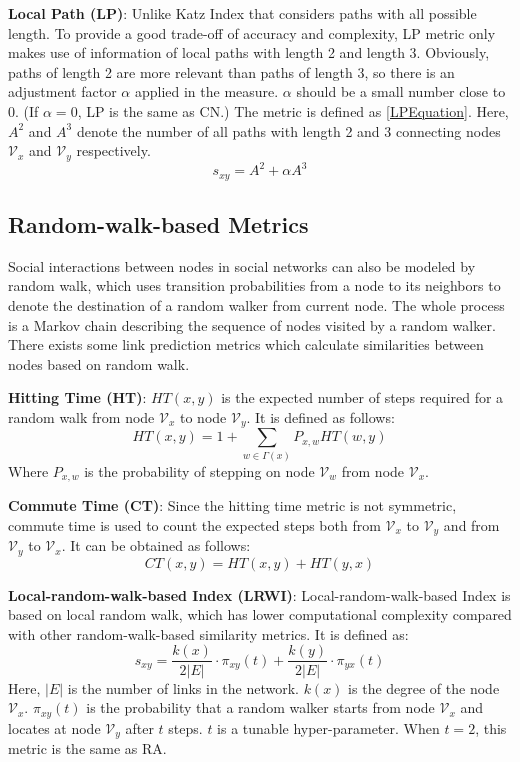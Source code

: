 \documentclass[\main/thesis.tex]{subfiles}
\begin{document}
\textbf{Local Path (LP)}: Unlike Katz Index that considers paths with all possible length. To provide a good trade-off of accuracy and complexity, LP metric \cite{lu2009similarity} only makes use of information of local paths with length 2 and length 3. Obviously, paths of length 2 are more relevant than paths of length 3, so there is an adjustment factor $\alpha$ applied in the measure. $\alpha$ should be a small number close to 0. (If $\alpha=0$, LP is the same as CN.) The metric is defined as \ref{LPEquation}. Here, $A^2$ and $A^3$ denote the number of all paths with length 2 and 3 connecting nodes $\mathcal{V}_x$ and $\mathcal{V}_y$ respectively.
\begin{equation}\label{LPEquation}
s_{xy}=A^2 + \alpha A^3
\end{equation}

\subsection{Random-walk-based Metrics}
Social interactions between nodes in social networks can also be modeled by random walk, which uses transition probabilities from a node to its neighbors to denote the destination of a random walker from current node. The whole process is a Markov chain describing the sequence of nodes visited by a random walker. There exists some link prediction metrics which calculate similarities between nodes based on random walk.

\textbf{Hitting Time (HT)}: \cite{gobel1974random} $HT(x, y)$ is the expected number of steps required for a random walk from node $\mathcal{V}_x$ to node $\mathcal{V}_y$. It is defined as follows:
\begin{equation}
HT(x,y) = 1 + \sum_{w\in \Gamma(x)}P_{x,w}HT(w,y) 
\end{equation}
Where $P_{x,w}$ is the probability of stepping on node $\mathcal{V}_w$ from node $\mathcal{V}_x$.

\textbf{Commute Time (CT)}: Since the hitting time metric is not symmetric, commute time is used to count the expected steps both from $\mathcal{V}_x$ to $\mathcal{V}_y$ and from $\mathcal{V}_y$ to $\mathcal{V}_x$. It can be obtained as follows:
\begin{equation}
CT(x,y) = HT(x,y) + HT(y,x)
\end{equation}

\textbf{Local-random-walk-based Index (LRWI)}: Local-random-walk-based Index is based on local random walk, which has lower computational complexity compared with other random-walk-based similarity metrics. It is defined as:
\begin{equation}
s_{xy}=\frac{k(x)}{2|E|}\cdot \pi_{xy}(t) + \frac{k(y)}{2|E|}\cdot \pi_{yx}(t) 
\end{equation}
Here, $|E|$ is the number of links in the network. $k(x)$ is the degree of the node $\mathcal{V}_x$. $\pi_{xy}(t)$ is the probability that a random walker starts from node $\mathcal{V}_x$ and locates at node $\mathcal{V}_y$ after $t$ steps. $t$ is a tunable hyper-parameter. When $t=2$, this metric is the same as RA.
\end{document}
